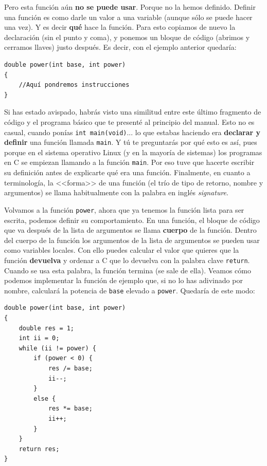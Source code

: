 \documentclass[a4paper]{article}
\begin{document}
Pero esta función aún \textbf{no se puede usar}. Porque no la hemos definido.
Definir una función es como darle un valor a una variable (aunque sólo se puede
hacer una vez). Y es decir \textbf{qué} hace la función. Para esto copiamos
de nuevo la declaración (sin el punto y coma), y ponemos un bloque de código
(abrimos y cerramos llaves) justo después. Es decir, con el ejemplo anterior
quedaría:


\noindent
\begin{minipage}[H]{\linewidth}
\mbox{}
\begin{lstlisting}[style=C, label={lst:functionDefinition},
caption={Definición de una función en C}]
double power(int base, int power)
{
    //Aquí pondremos instrucciones
}
\end{lstlisting}
\end{minipage}

Si has estado avispado, habrás visto una similitud entre este último fragmento
de código y el programa básico que te presenté al principio del manual. Esto
no es casual, cuando ponías \verb!int main(void)!... lo que estabas haciendo era
\textbf{declarar y definir} una función llamada \verb!main!. Y tú te
preguntarás por qué esto es así, pues porque en el sistema operativo Linux (y en
la mayoría de sistemas) los programas en C se empiezan llamando a la
función \verb!main!. Por eso tuve que hacerte escribir su definición antes de
explicarte qué era una función. Finalmente, en cuanto a terminología, la
<<forma>> de una función (el trío de tipo de retorno, nombre y argumentos) se
llama habitualmente con la palabra en inglés \emph{signature}.

Volvamos a la función \verb!power!, ahora que ya tenemos la función lista
para ser escrita, podemos definir su comportamiento. En una función, el bloque
de código que va después de la lista de argumentos se llama \textbf{cuerpo} de
la función. Dentro del cuerpo de la función los argumentos de la lista de
argumentos se pueden usar como variables locales.
Con ello puedes calcular el valor
que quieres que la función \textbf{devuelva} y ordenar a C que lo devuelva con
la palabra clave \lstinline[style=C]{return}. Cuando se usa esta palabra,
la función termina (se sale de ella). Veamos cómo podemos implementar la
función de ejemplo que, si no lo has adivinado por nombre, calculará la potencia
de \verb!base! elevado a \verb!power!. Quedaría de este modo:


\noindent
\begin{minipage}[H]{\linewidth}
\mbox{}
\begin{lstlisting}[style=C, label={lst:functionExample},
caption={Ejemplo de función en C}]
double power(int base, int power)
{
    double res = 1;
    int ii = 0;
    while (ii != power) {
        if (power < 0) {
            res /= base;
            ii--;
        }
        else {
            res *= base;
            ii++;
        }
    }
    return res;
}
\end{lstlisting}
\end{minipage}
\end{document}
